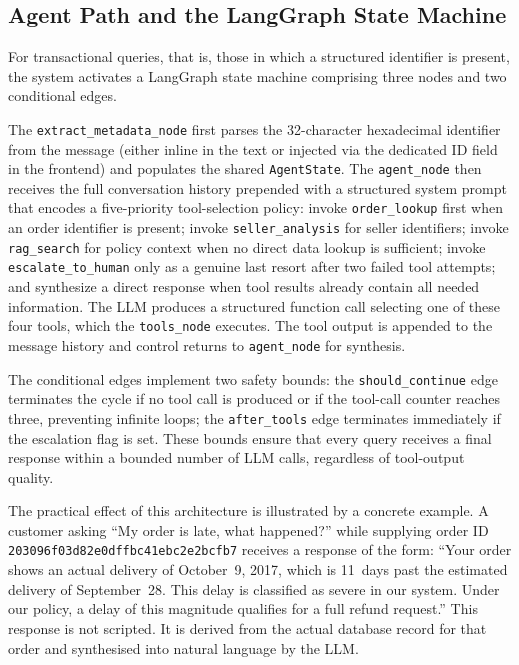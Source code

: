 \documentclass[conference]{IEEEtran}
\begin{document}
\subsection{Agent Path and the LangGraph State Machine}
For transactional queries, that is, those in which a structured identifier is
present, the system activates a LangGraph state machine comprising three nodes
and two conditional edges.

The \texttt{extract\_metadata\_node} first parses the 32-character hexadecimal
identifier from the message (either inline in the text or injected via the dedicated
ID field in the frontend) and populates the shared \texttt{AgentState}. The
\texttt{agent\_node} then receives the full conversation history prepended with a
structured system prompt that encodes a five-priority tool-selection policy: invoke
\texttt{order\_lookup} first when an order identifier is present; invoke
\texttt{seller\_analysis} for seller identifiers; invoke \texttt{rag\_search} for
policy context when no direct data lookup is sufficient; invoke
\texttt{escalate\_to\_human} only as a genuine last resort after two failed tool
attempts; and synthesize a direct response when tool results already contain all
needed information. The LLM produces a structured function call selecting one of
these four tools, which the \texttt{tools\_node} executes. The tool output is
appended to the message history and control returns to \texttt{agent\_node} for
synthesis.

The conditional edges implement two safety bounds: the \texttt{should\_continue}
edge terminates the cycle if no tool call is produced or if the tool-call counter
reaches three, preventing infinite loops; the \texttt{after\_tools} edge terminates
immediately if the escalation flag is set. These bounds ensure that every query
receives a final response within a bounded number of LLM calls, regardless of
tool-output quality.

The practical effect of this architecture is illustrated by a concrete example.
A customer asking ``My order is late, what happened?'' while supplying order
ID \texttt{203096f03d82e0dffbc41ebc2e2bcfb7} receives a response of the form:
``Your order shows an actual delivery of October~9, 2017, which is 11~days past
the estimated delivery of September~28. This delay is classified as severe in our
system. Under our policy, a delay of this magnitude qualifies for a full refund
request.'' This response is not scripted. It is derived from the actual database
record for that order and synthesised into natural language by the LLM.
\end{document}
